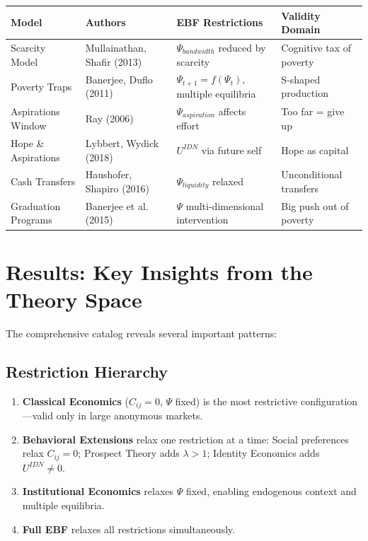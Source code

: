 \small
\begin{longtable}{@{}p{3cm}p{2.5cm}p{4cm}p{4cm}@{}}
\toprule
\textbf{Model} & \textbf{Authors} & \textbf{EBF Restrictions} & \textbf{Validity Domain} \\
\midrule
\endhead

Scarcity Model & Mullainathan, Shafir (2013) &
$\Psi_{bandwidth}$ reduced by scarcity &
Cognitive tax of poverty \\

Poverty Traps & Banerjee, Duflo (2011) &
$\Psi_{t+1} = f(\Psi_t)$, multiple equilibria &
S-shaped production \\

Aspirations Window & Ray (2006) &
$\Psi_{aspiration}$ affects effort &
Too far = give up \\

Hope \& Aspirations & Lybbert, Wydick (2018) &
$U^{IDN}$ via future self &
Hope as capital \\

Cash Transfers & Haushofer, Shapiro (2016) &
$\Psi_{liquidity}$ relaxed &
Unconditional transfers \\

Graduation Programs & Banerjee et al. (2015) &
$\Psi$ multi-dimensional intervention &
Big push out of poverty \\

\bottomrule
\end{longtable}
\normalsize

\section{Results: Key Insights from the Theory Space}
\label{sec:ms-results}

The comprehensive catalog reveals several important patterns:

\subsection{Restriction Hierarchy}

\begin{enumerate}
    \item \textbf{Classical Economics} ($C_{ij} = 0$, $\Psi$ fixed) is the most
          restrictive configuration—valid only in large anonymous markets.
    \item \textbf{Behavioral Extensions} relax one restriction at a time:
          Social preferences relax $C_{ij} = 0$; Prospect Theory adds $\lambda > 1$;
          Identity Economics adds $U^{IDN} \neq 0$.
    \item \textbf{Institutional Economics} relaxes $\Psi$ fixed, enabling
          endogenous context and multiple equilibria.
    \item \textbf{Full EBF} relaxes all restrictions simultaneously.
\end{enumerate}

